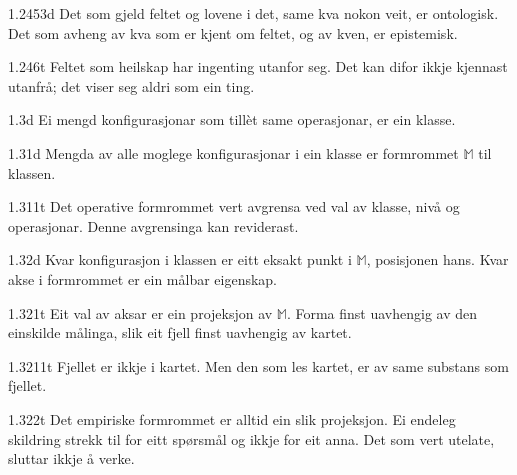 \begin{formproposition}{1.2453}{d}
Det som gjeld feltet og lovene i det, same kva nokon veit, er ontologisk. Det som avheng av kva som er kjent om feltet, og av kven, er epistemisk.
\end{formproposition}

\begin{formproposition}{1.246}{t}
Feltet som heilskap har ingenting utanfor seg. Det kan difor ikkje kjennast utanfrå; det viser seg aldri som ein ting.
\end{formproposition}

\begin{formproposition}{1.3}{d}
Ei mengd konfigurasjonar som tillèt same operasjonar, er ein klasse.
\end{formproposition}

\begin{formproposition}{1.31}{d}
Mengda av alle moglege konfigurasjonar i ein klasse er formrommet \(𝕄\) til klassen.
\end{formproposition}

\begin{formproposition}{1.311}{t}
Det operative formrommet vert avgrensa ved val av klasse, nivå og operasjonar. Denne avgrensinga kan reviderast.
\end{formproposition}

\begin{formproposition}{1.32}{d}
Kvar konfigurasjon i klassen er eitt eksakt punkt i \(𝕄\), posisjonen hans. Kvar akse i formrommet er ein målbar eigenskap.
\end{formproposition}

\begin{formproposition}{1.321}{t}
Eit val av aksar er ein projeksjon av \(𝕄\). Forma finst uavhengig av den einskilde målinga, slik eit fjell finst uavhengig av kartet.
\end{formproposition}

\begin{formproposition}{1.3211}{t}
Fjellet er ikkje i kartet. Men den som les kartet, er av same substans som fjellet.
\end{formproposition}

\begin{formproposition}{1.322}{t}
Det empiriske formrommet er alltid ein slik projeksjon. Ei endeleg skildring strekk til for eitt spørsmål og ikkje for eit anna. Det som vert utelate, sluttar ikkje å verke.
\end{formproposition}

